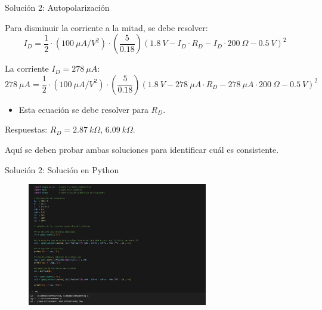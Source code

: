 \documentclass[t,aspectratio=169]{beamer}
\begin{document}
\begin{frame}{Solución 2: Autopolarización}

Para disminuir la corriente a la mitad, se debe resolver:
\[ I_D = \dfrac{1}{2} \cdot (100\ \mu A/V^2) \cdot \left(\dfrac{5}{0.18}\right) \left(1.8\ V - I_D \cdot R_D - I_D \cdot 200\ \Omega - 0.5\ V\right)^2 \]

La corriente $I_D = 278\ \mu A$:
\[ 278\ \mu A = \dfrac{1}{2} \cdot (100\ \mu A/V^2) \cdot \left(\dfrac{5}{0.18}\right) \left(1.8\ V - 278\ \mu A \cdot R_D - 278\ \mu A \cdot 200\ \Omega - 0.5\ V\right)^2 \]

\begin{itemize}
    \item Esta ecuación se debe resolver para $R_D$.
\end{itemize}

\vspace{5mm}
Respuestas: $ R_D = 2.87\ k\Omega$, $6.09\ k\Omega$.

\vspace{5mm}
Aquí se deben probar ambas soluciones para identificar cuál es consistente.

\end{frame}


\begin{frame}{Solución 2: Solución en Python}

\begin{figure}
    \centering
    \includegraphics[width=0.7\textwidth]{figuras/python_ejemplo_2.png}
\end{figure}
    
\end{frame}
\end{document}
